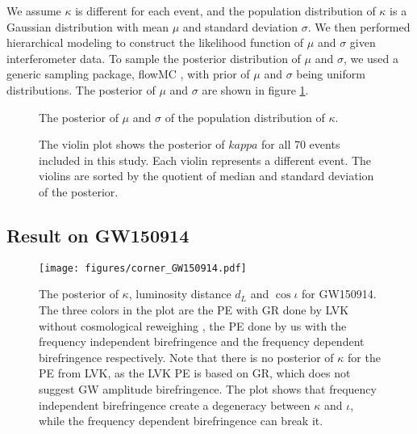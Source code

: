 \documentclass[reprint,amsmath,amssymb,aps,twocolumn]{aastex631}
\begin{document}

We assume $\kappa$ is different for each event, and the population distribution of $\kappa$ is a Gaussian distribution with mean $\mu$ and standard deviation $\sigma$.
We then performed hierarchical modeling to construct the likelihood function of $\mu$ and $\sigma$ given interferometer data.
To sample the posterior distribution of $\mu$ and $\sigma$, we used a generic sampling package, flowMC \citep{flowMC}, with prior of $\mu$ and $\sigma$ being uniform distributions.
The posterior of $\mu$ and $\sigma$ are shown in figure \ref{fig:corner_Gaussian}.


\begin{figure}[h]
    \caption{
        The posterior of $\mu$ and $\sigma$ of the population distribution of $\kappa$.
    }
    \label{fig:corner_Gaussian}
\end{figure}



\begin{figure}[h]
    \caption{
        The violin plot shows the posterior of $kappa$ for all 70 events included in this study.
        Each violin represents a different event.
        The violins are sorted by the quotient of median and standard deviation of the posterior.
    }
    \label{fig:violin_kappa}
\end{figure}




\subsection{Result on GW150914}

\begin{figure}[h]
    \texttt{[image: figures/corner\_GW150914.pdf]}
    \caption{
        The posterior of $\kappa$, luminosity distance $d_L$ and $\cos{\iota}$ for GW150914.
        The three colors in the plot are the PE with GR done by LVK without cosmological reweighing \citep{GWTC-2.1, GWTC-3}, the PE done by us with the frequency independent birefringence and the frequency dependent birefringence respectively.
        Note that there is no posterior of $\kappa$ for the PE from LVK, as the LVK PE is based on GR, which does not suggest GW amplitude birefringence.
        The plot shows that frequency independent birefringence create a degeneracy between $\kappa$ and $\iota$, while the frequency dependent birefringence can break it.
    }
    \label{fig:corner_GW150914}
\end{figure}
\end{document}
